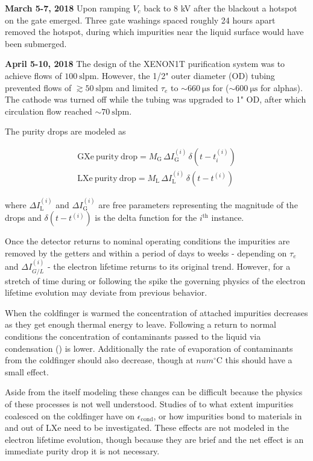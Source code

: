 \textbf{March 5-7, 2018}  Upon ramping $V_c$ back to 8 kV after the blackout a hotspot on the gate emerged.  Three gate washings spaced
roughly 24 hours apart removed the hotspot, during which impurities near the liquid surface would have been submerged.

\textbf{April 5-10, 2018}  The design of the XENON1T purification system was to achieve flows of $100\ \mathrm{slpm}$.  However, the
1/2" outer diameter (OD) tubing prevented flows of $\gtrsim 50\ \mathrm{slpm}$ and limited $\tau_e$ to ${\sim} 660\ \mathrm{\mu s}$ for
\metakr (${\sim} 600\ \mathrm{\mu s}$ for alphas).  The cathode was turned off while the tubing was upgraded to 1" OD, after which
circulation flow reached ${\sim} 70\ \mathrm{slpm}$.

The purity drops are modeled as

\begin{subequations}
\begin{align}
\mathrm{GXe\ purity\ drop} = M_{\mathrm{G}}\, \Delta I_{\mathrm{G}}^{(i)}\, \delta (t - t_i^{(i)})
\\
\mathrm{LXe\ purity\ drop} = M_{\mathrm{L}}\, \Delta I_{\mathrm{L}}^{(i)}\, \delta (t - t^{(i)})
\end{align}
\end{subequations}

\noindent where $\Delta I_{\mathrm{L}}^{(i)}$ and $\Delta I_{\mathrm{G}}^{(i)}$ are free parameters representing the magnitude of the drops and
$\delta (t - t^{(i)})$ is the delta function for the $i^{\mathrm{th}}$ instance.

Once the detector returns to nominal operating conditions the impurities are removed by the getters and within a period of days to
weeks - depending on $\tau_e$ and $\Delta I_{G/L}^{(i)}$ - the electron lifetime returns to its original trend.  However, for a stretch of
time during
or following the spike the governing physics of the electron lifetime evolution may deviate from previous behavior.

When the coldfinger is warmed the concentration of attached impurities decreases as they get enough thermal energy to leave.  Following
a return to normal conditions the concentration of contaminants passed to the liquid via condensation
() is lower.  Additionally the rate of evaporation of contaminants from
the coldfinger should also decrease, though at $num^{\circ} \mathrm{C}$ this should have a small effect.

Aside from the itself modeling these changes can be difficult because the physics of these processes is not well understood.  Studies
of to what extent impurities coalesced on the coldfinger have on $\epsilon_{\mathrm{cond}}$, or how impurities bond to materials in and
out of LXe need to be investigated.  These effects are not modeled in the electron lifetime evolution, though because they are brief and
the net effect is an immediate purity drop it is not necessary.



